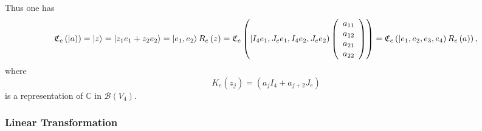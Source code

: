 \documentclass[aps,preprint]{revtex4}%
\begin{document}
Thus one has
\begin{equation}
\mathfrak{C}_{e}\left(  \left\vert a\right)  \right)  =\left\vert
z\right\rangle =\left\vert z_{1}e_{1}+z_{2}e_{2}\right\rangle =\left\vert
e_{1},e_{2}\right\rangle R_{e}\left(  z\right)  =\mathfrak{C}_{e}\left(
\left\vert I_{4}e_{1},J_{e}e_{1},I_{4}e_{2},J_{e}e_{2}\right)  \left(
\begin{array}
[c]{c}%
a_{11}\\
a_{12}\\
a_{21}\\
a_{22}%
\end{array}
\right)  \right)  =\mathfrak{C}_{e}\left(  \left\vert e_{1},e_{2},e_{3}%
,e_{4}\right)  R_{e}\left(  a\right)  \right)  ,
\end{equation}
where
\begin{equation}
K_{e}\left(  z_{j}\right)  =\left(  a_{j}I_{4}+a_{j+2}J_{e}\right)
\end{equation}
is a representation of $\mathbb{C}$ in $\mathcal{B}\left(  V_{4}\right)  .$

\subsubsection{\bigskip Linear Transformation}
\end{document}
